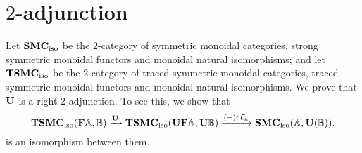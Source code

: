 
\section{$2$-adjunction}
\label{2-adjunction}

Let $\mathbf{SMC}_{\mathrm{iso}}$ be the $2$-category of symmetric monoidal categories,
strong symmetric monoidal functors and monoidal natural isomorphisms;
and let $\mathbf{TSMC}_{\mathrm{iso}}$ be the $2$-category of traced symmetric
monoidal categories, traced symmetric monoidal functors and monoidal
natural isomorphisms. We prove that $\mathbf{U}$ is a right $2$-adjunction.
To see this, we show that
\begin{equation*}
  \mathbf{TSMC}_{\mathrm{iso}}(\mathbf{F}\mathbb{A},\mathbb{B}) \xrightarrow{\mathbf{U}}
  \mathbf{TSMC}_{\mathrm{iso}}(\mathbf{U}\mathbf{F}\mathbb{A},\mathbf{U}\mathbb{B}) \xrightarrow{(-) \circ \textit{\textsf{E}}_{\mathbb{A}}}
  \mathbf{SMC}_{\mathrm{iso}}(\mathbb{A},\mathbf{U}(\mathbb{\mathbb{B}})).
\end{equation*}
is an isomorphism between them.

